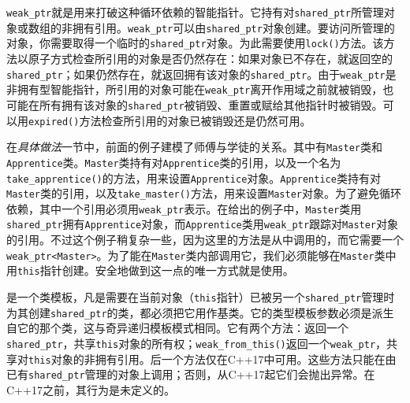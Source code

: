 
\texttt{weak\_\allowbreak{}ptr}就是用来打破这种循环依赖的智能指针。它持有对\texttt{shared\_\allowbreak{}ptr}所管理对象或数组的非拥有引用。\texttt{weak\_\allowbreak{}ptr}可以由\texttt{shared\_\allowbreak{}ptr}对象创建。要访问所管理的对象，你需要取得一个临时的\texttt{shared\_\allowbreak{}ptr}对象。为此需要使用\texttt{lock()}方法。该方法以原子方式检查所引用的对象是否仍然存在：如果对象已不存在，就返回空的\texttt{shared\_\allowbreak{}ptr}；如果仍然存在，就返回拥有该对象的\texttt{shared\_\allowbreak{}ptr}。由于\texttt{weak\_\allowbreak{}ptr}是非拥有型智能指针，所引用的对象可能在\texttt{weak\_\allowbreak{}ptr}离开作用域之前就被销毁，也可能在所有拥有该对象的\texttt{shared\_\allowbreak{}ptr}被销毁、重置或赋给其他指针时被销毁。可以用\texttt{expired()}方法检查所引用的对象已被销毁还是仍然可用。



在\textit{具体做法}一节中，前面的例子建模了师傅与学徒的关系。其中有\texttt{Master}类和\texttt{Apprentice}类。\texttt{Master}类持有对\texttt{Apprentice}类的引用，以及一个名为\texttt{take\_\allowbreak{}apprentice()}的方法，用来设置\texttt{Apprentice}对象。\texttt{Apprentice}类持有对\texttt{Master}类的引用，以及\texttt{take\_\allowbreak{}master()}方法，用来设置\texttt{Master}对象。为了避免循环依赖，其中一个引用必须用\texttt{weak\_\allowbreak{}ptr}表示。在给出的例子中，\texttt{Master}类用\texttt{shared\_\allowbreak{}ptr}拥有\texttt{Apprentice}对象，而\texttt{Apprentice}类用\texttt{weak\_\allowbreak{}ptr}跟踪对\texttt{Master}对象的引用。不过这个例子稍复杂一些，因为这里的方法是从中调用的，而它需要一个\texttt{weak\_\allowbreak{}ptr<\allowbreak{}Master>}。为了能在\texttt{Master}类内部调用它，我们必须能够在\texttt{Master}类中用\texttt{this}指针创建。安全地做到这一点的唯一方式就是使用。



是一个类模板，凡是需要在当前对象（\texttt{this}指针）已被另一个\texttt{shared\_\allowbreak{}ptr}管理时为其创建\texttt{shared\_\allowbreak{}ptr}的类，都必须把它用作基类。它的类型模板参数必须是派生自它的那个类，这与奇异递归模板模式相同。它有两个方法：返回一个\texttt{shared\_\allowbreak{}ptr}，共享\texttt{this}对象的所有权；\texttt{weak\_\allowbreak{}from\_\allowbreak{}this()}返回一个\texttt{weak\_\allowbreak{}ptr}，共享对\texttt{this}对象的非拥有引用。后一个方法仅在C++17中可用。这些方法只能在由已有\texttt{shared\_\allowbreak{}ptr}管理的对象上调用；否则，从C++17起它们会抛出异常。在C++17之前，其行为是未定义的。


